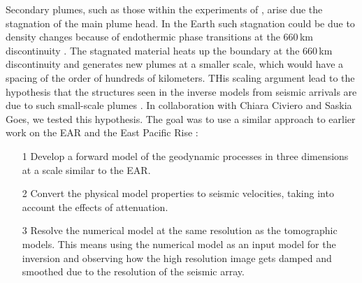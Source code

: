 Secondary plumes, such as those within the experiments of \cite{kumagai-etal-2007}, arise due the stagnation of the main plume head. In the Earth such stagnation could be due to density changes because of endothermic phase transitions at the 660\,km discontinuity \citep[e.g.][]{tosi-2011,bossmann-2013}. The stagnated material heats up the boundary at the 660\,km discontinuity and generates new plumes at a smaller scale, which would have a spacing of the order of hundreds of kilometers. THis scaling argument lead to the hypothesis that the structures seen in the inverse models from seismic arrivals are due to such small-scale plumes \citep{civiero-etal-2015}. In collaboration with Chiara Civiero and Saskia Goes, we tested this hypothesis. The goal was to use a similar approach to earlier work on the EAR and the East Pacific Rise \citep{armitage-etal-2015,goes-etal-2012}:
\begin{itemize}
\item[1] Develop a forward model of the geodynamic processes in three dimensions at a scale similar to the EAR.
\item[2] Convert the physical model properties to seismic velocities, taking into account the effects of attenuation.
\item[3] Resolve the numerical model at the same resolution as the tomographic models. This means using the numerical model as an input model for the inversion and observing how the high resolution image gets damped and smoothed due to the resolution of the seismic array.
\end{itemize}

